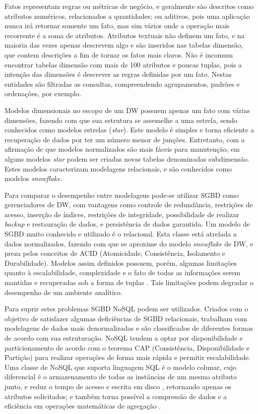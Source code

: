 \documentclass[12pt]{article}
\begin{document}
Fatos representam regras ou métricas de negócio, e geralmente são descritos como atributos 
numéricos, relacionados a quantidades; ou aditivos, pois uma aplicação nunca irá retornar somente um fato, 
mas sim vários onde a operação mais recorrente é a soma de atributos.
Atributos textuais não definem um fato, e na maioria das vezes apenas descrevem algo e são inseridos 
nas tabelas dimensão, que contem descrições a fim de tornar os fatos mais claros. Não é incomum encontrar tabelas dimensão  
com mais de 100 atributos e poucas tuplas, pois a intenção das dimensões é descrever as regras definidas por um 
fato. Nestas entidades são filtradas as consultas, compreendendo agrupamentos, padrões e ordenações, por exemplo.

Modelos dimensionais no escopo de um DW possuem apenas um fato com várias dimensões, fazendo com que 
sua estrutura se assemelhe a uma estrela, sendo conhecidos como modelos estrelas (\textit{star}). Este modelo é 
simples e torna eficiente a recuperação de dados por ter um número menor de junções. Entretanto, com a afirmação de 
que modelos normalizados são mais fáceis para manutenção, em alguns modelos \textit{star} podem ser criadas 
novas tabelas denominadas subdimensão. Estes modelos caracterizam modelagens relacionais, e são conhecidos 
como modelos \textit{snowflake}.

Para comparar o desempenho entre modelagens pode-se utilizar SGBD como gerenciadores de DW, 
com vantagens como controle de redundância, restrições de acesso, 
inserção de índices, restrições de integridade, possibilidade de realizar \textit{backup} e restauração de dados, e persistência 
de dados garantida. Um modelo de SGBD muito conhecido e utilizado é o relacional. Esta classe está atrelada a dados 
normalizados, fazendo com que se aproxime do modelo \textit{snowflake} de DW, 
e preza pelos conceitos de ACID (Atomicidade, Consistência, Isolamento e Durabilidade). Modelos 
assim definidos possuem, porém, algumas limitações quanto à escalabilidade, complexidade e o fato de todas as informações serem 
mantidas e recuperadas sob a forma de tuplas \cite{leavitt2010will}. Tais limitações podem degradar o desempenho de 
um ambiente analítico. 

Para suprir estes problemas SGBD NoSQL podem ser utilizados. Criados com o objetivo de satisfazer algumas deficiências 
de SGBD relacionais, trabalham com modelagens de dados mais denormalizadas e são classificados 
de diferentes formas de acordo com sua estruturação. NoSQL tendem a optar por disponibilidade e particionamento 
de acordo com o teorema CAP (Consistência, Disponibilidade e Partição) \cite{brewer2000towards} 
para realizar operações de forma mais rápida e permitir escalabilidade. 
Uma classe de NoSQL que suporta linguagem SQL é o modelo colunar, cujo 
diferencial é o armazenamento de todas as instâncias de um mesmo atributo junto, e reduz o tempo de acesso e 
escrita em disco \cite{matei2010column, abadi2008query}, retornando apenas os atributos solicitados; e também 
torna possível a compressão de dados \cite{abadi2006integrating} e a eficiência em operações 
matemáticas de agregação \cite{matei2010column}.
\end{document}
